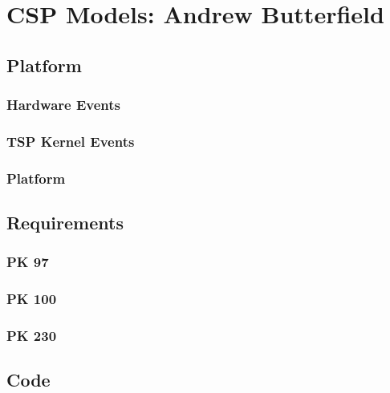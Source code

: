 \section{CSP Models: Andrew Butterfield}

\subsection{Platform}

\subsubsection{Hardware Events}


\subsubsection{TSP Kernel  Events}


\subsubsection{Platform}


\subsection{Requirements}

\subsubsection{PK 97}


\subsubsection{PK 100}


\subsubsection{PK 230}


\subsection{Code}


